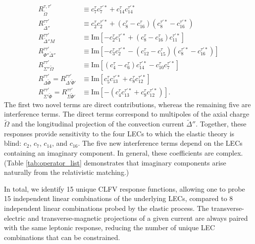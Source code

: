 \documentclass[12pt,letterpaper]{book}
\begin{document}
\begin{equation}
\begin{split}
R_{\tilde{\Omega}}^{\tau,\tau'}&\equiv c_7^{\tau}c_7^{\tau'*}+c_{14}^{\tau}c_{14}^{\tau'*}\\
R_{\tilde{\Delta}''}^{\tau\tau'}&\equiv c_2^{\tau}c_2^{\tau'*}+(c_8^{\tau}-c_{16}^{\tau})(c_8^{\tau'*}-c_{16}^{\tau'*})\\
R_{\tilde{\Delta}''M}^{\tau\tau'}&\equiv\mathrm{Im}\left[-c_2^{\tau}c_1^{\tau'*}+(c_8^{\tau}-c_{16}^{\tau})c_{11}^{\tau'*}\right]\\
R_{\Phi''\tilde{\Delta}''}^{\tau\tau'}&\equiv\mathrm{Im}\left[-c_3^{\tau}c_2^{\tau'*}-(c_{12}^{\tau}-c_{15}^{\tau})(c_8^{\tau'*}-c_{16}^{\tau'*})\right]\\
R_{\Sigma''\tilde{\Omega}}^{\tau\tau'}&\equiv\mathrm{Im}\left[(c_4^{\tau}-c_6^{\tau})c_{14}^{\tau'*}-c_{10}^{\tau}c_7^{\tau'*}\right]\\
R_{\Delta\tilde{\Phi}}^{\tau\tau'}=R_{\Delta'\tilde{\Phi}'}^{\tau\tau'}&\equiv\mathrm{Im}\left[c_5^{\tau}c_{13}^{\tau'*}+c_8^{\tau}c_{12}^{\tau'*}\right]\\
R_{\Sigma'\tilde{\Phi}}^{\tau\tau'}=R_{\Sigma\tilde{\Phi}'}^{\tau\tau'}&\equiv\mathrm{Im}\left[-\left(c_4^{\tau}c_{13}^{\tau'*}+c_9^{\tau}c_{12}^{\tau'*}\right)\right].
\end{split}
\end{equation}
The first two novel terms are direct contributions, whereas the remaining five are interference terms. The direct terms correspond to multipoles of the axial charge $\tilde{\Omega}$ and the longitudinal projection of the convection current $\tilde{\Delta}''$. Together, these responses provide sensitivity to the four LECs to which the elastic theory is blind: $c_2$, $c_7$, $c_{14}$, and $c_{16}$. The five new interference terms depend on the LECs containing an imaginary component. In general, these coefficients are complex. (Table \ref{tab:operator_list} demonstrates that imaginary components arise naturally from the relativistic matching.)

In total, we identify 15 unique CLFV response functions, allowing one to probe 15 independent linear combinations of the underlying LECs, compared to 8 independent linear combinations probed by the elastic process. The transverse-electric and transverse-magnetic projections of a given current are always paired with the same leptonic response, reducing the number of unique LEC combinations that can be constrained.
\end{document}
